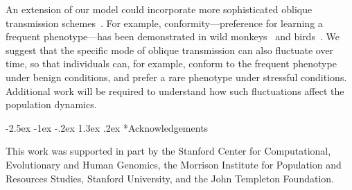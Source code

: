 \documentclass[14pt]{extarticle}
\makeatletter
\renewcommand\section{\@startsection {section}{1}{\z@}%
     {-2.5ex \@plus -1ex \@minus -.2ex}%
     {1.3ex \@plus.2ex}%
    {\Large\bfseries}}
\makeatother
\begin{document}
An extension of our model could incorporate more sophisticated oblique transmission schemes~\citep[][Figure~3]{Creanza2017}.
For example, conformity---preference for learning a frequent phenotype---has been demonstrated in wild monkeys~\citep{VanDeWaal2013} and birds~\citep{Aplin2015}.
We suggest that the specific mode of oblique transmission can also fluctuate over time, so that individuals can, for example, conform to the frequent phenotype under benign conditions, and prefer a rare phenotype under stressful conditions.
Additional work will be required to understand how such fluctuations affect the population dynamics. 


{\small
\section*{Acknowledgements}

This work was supported in part by 
the Stanford Center for Computational, Evolutionary and Human Genomics, 
the Morrison Institute for Population and Resources Studies, Stanford University, and the John Templeton Foundation.
}


%

\end{document}
